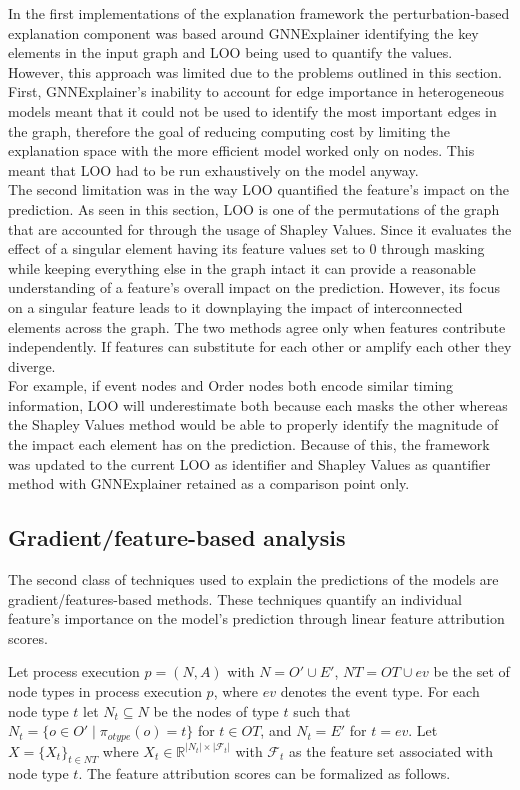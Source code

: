             In the first implementations of the explanation framework the perturbation-based explanation component was based around GNNExplainer identifying the key elements in the input graph and LOO being used to quantify the values. However, this approach was limited due to the problems outlined in this section. First, GNNExplainer's inability to account for edge importance in heterogeneous models meant that it could not be used to identify the most important edges in the graph, therefore the goal of reducing computing cost by limiting the explanation space with the more efficient model worked only on nodes. This meant that LOO had to be run exhaustively on the model anyway.\\
            The second limitation was in the way LOO quantified the feature's impact on the prediction. As seen in this section, LOO is one of the permutations of the graph that are accounted for through the usage of Shapley Values. Since it evaluates the effect of a singular element having its feature values set to 0 through masking while keeping everything else in the graph intact it can provide a reasonable understanding of a feature's overall impact on the prediction. However, its focus on a singular feature leads to it downplaying the impact of interconnected elements across the graph. The two methods agree only when features contribute independently. If features can substitute for each other or amplify each other they diverge. \\
            For example, if event nodes and Order nodes both encode similar timing information, LOO will underestimate both because each masks the other whereas the Shapley Values method would be able to properly identify the magnitude of the impact each element has on the prediction. Because of this, the framework was updated to the current LOO as identifier and Shapley Values as quantifier method with GNNExplainer retained as a comparison point only.
            
        \subsection{Gradient/feature-based analysis}
        \label{sec:dataset_gradient}
            The second class of techniques used to explain the predictions of the models are gradient/features-based methods. These techniques quantify an individual feature's importance on the model's prediction through linear feature attribution scores.

            Let process execution $p=(N,A)$ with $N=O'\cup E'$, $NT=OT\cup{ev}$ be the set of node types in process execution $p$, where $ev$ denotes the event type. For each node type $t$ let $N_t\subseteq N$ be the nodes of type $t$ such that $N_t = \{o \in O' \mid \pi_{otype}(o)=t\}$ for $t\in OT$, and $N_t=E'$ for $t=ev$.
            Let $X = \{X_t\}_{t\in NT}$ where $X_t\in \mathbb{R}^{|N_t|\times|\mathcal{F}_t|}$ with $\mathcal{F}_t$ as the feature set associated with node type $t$.
            The feature attribution scores can be formalized as follows.

